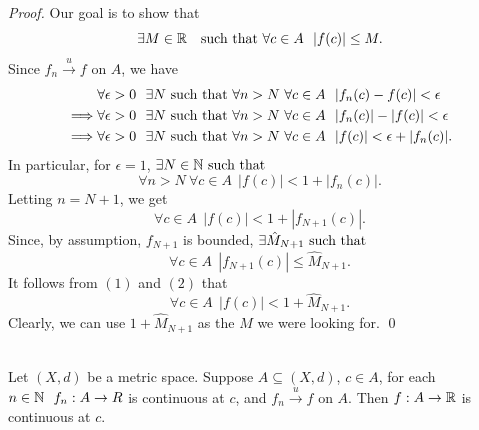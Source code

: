 \begin{proof}
    Our goal is to show that
    $$\exists M \in \mathbb{R} ~~\text{ such that } \forall c \in A ~~|f(c)| \leq M.$$
    Since $f_n \overset{u}{\to}f$ on $A$, we have 
    \begin{align*}
        &\forall \epsilon > 0 ~~\exists N \text{ such that } \forall n > N ~\forall c \in A ~~|f_n(c) - f(c)| < \epsilon \\
        \implies &\forall \epsilon > 0 ~~\exists N \text{ such that } \forall n > N ~\forall c \in A ~~|f_n(c)| - |f(c)| < \epsilon \\
        \implies &\forall \epsilon > 0 ~~\exists N \text{ such that } \forall n > N ~\forall c \in A ~~|f(c)| < \epsilon + |f_n(c)|.
    \end{align*}
    In particular, for $\epsilon = 1$, $\exists N \in \mathbb{N} \text{ such that }$
    $$\forall n > N ~\forall c \in A ~~|f(c)| < 1 + |f_n(c)|.$$
    Letting $n = N+1$, we get
    \[\forall c \in A ~~|f(c)| < 1 + |f_{N+1}(c)|. \tag{1}\]
    Since, by assumption, $f_{N+1}$ is bounded, $\exists \hat{M}_{N+1} \text{ such that }$
    \[\forall c \in A ~~|f_{N+1}(c)| \leq \hat{M}_{N+1}. \tag{2}\]
    It follows from $(1)$ and $(2)$ that
    $$\forall c \in A ~~|f(c)| < 1 + \hat{M}_{N+1}.$$
    Clearly, we can use $1+\hat{M}_{N+1}$ as the $M$ we were looking for.
    \qed
\end{proof}

\begin{theorem} \leavevmode \\
    \label{Thm7.2}
    Let $(X, d)$ be a metric space. Suppose $A\subseteq (X, d)$, $c \in A$, for each $n \in \mathbb{N} ~~f_n: A \to R$ is continuous at $c$, and $f_n \overset{u}{\to}f$ on $A$. Then $f: A\to \mathbb{R}$ is continuous at $c$.
\end{theorem}

